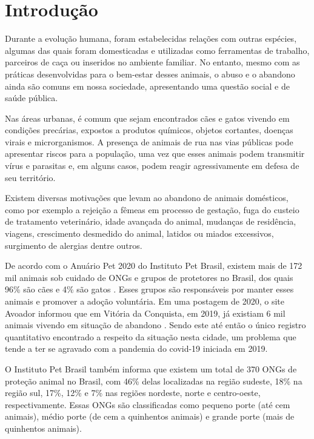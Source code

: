 %
\chapter{Introdução}
\label{cap:Introdução}
\hyperlink{chap:Introdução}{}
Durante a evolução humana, foram estabelecidas relações com outras espécies, algumas das quais foram domesticadas e utilizadas como ferramentas de trabalho, parceiros de caça ou inseridos no ambiente familiar. No entanto, mesmo com as práticas desenvolvidas para o bem-estar desses animais, o abuso e o abandono ainda são comuns em nossa sociedade, apresentando uma questão social e de saúde pública.

Nas áreas urbanas, é comum que sejam encontrados cães e gatos vivendo em condições precárias, expostos a produtos químicos, objetos cortantes, doenças virais e microrganismos. A presença de animais de rua nas vias públicas pode apresentar riscos para a população, uma vez que esses animais podem transmitir vírus e parasitas e, em alguns casos, podem reagir agressivamente em defesa de seu território.

Existem diversas motivações que levam ao abandono de animais domésticos, como por exemplo a rejeição a fêmeas em processo de gestação, fuga do custeio de tratamento veterinário, idade avançada do animal, mudanças de residência, viagens, crescimento desmedido do animal, latidos ou miados excessivos, surgimento de alergias dentre outros.

De acordo com o Anuário Pet 2020 do Instituto Pet Brasil, existem mais de 172 mil animais sob cuidado de ONGs e grupos de protetores no Brasil, dos quais 96\% são cães e 4\% são gatos \cite{institutopetbrasil2020}. Esses grupos são responsáveis por manter esses animais e promover a adoção voluntária. Em uma postagem de 2020, o site Avoador informou que em Vitória da Conquista, em 2019, já existiam 6 mil animais vivendo em situação de abandono \cite{avoador2020}. Sendo este até então o único registro quantitativo encontrado a respeito da situação nesta cidade, um problema que tende a ter se agravado com a pandemia do covid-19 iniciada em 2019.

O Instituto Pet Brasil também informa que existem um total de 370 ONGs de proteção animal no Brasil, com 46\% delas localizadas na região sudeste, 18\% na região sul, 17\%, 12\% e 7\% nas regiões nordeste, norte e centro-oeste, respectivamente. Essas ONGs são classificadas como pequeno porte (até cem animais), médio porte (de cem a quinhentos animais) e grande porte (mais de quinhentos animais)\cite{institutopetbrasil2020}.	

